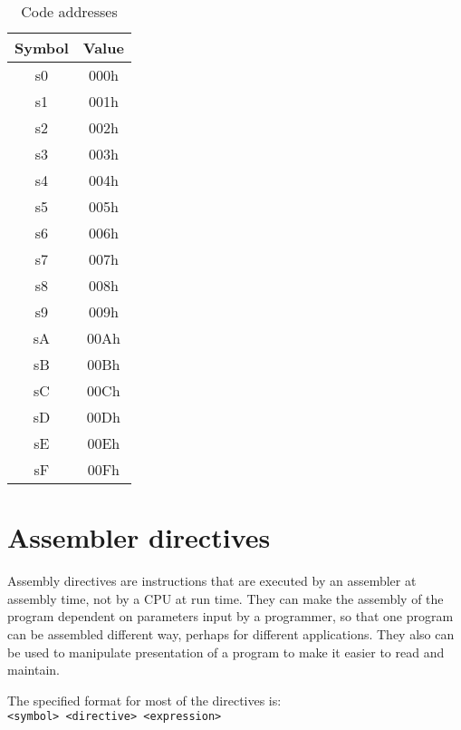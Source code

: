         \begin{table}[h!]
            \centering{}
            \mysmallfont{}

            \begin{tabular}{|cc|}
                \hline
                Symbol & Value \\\hline
                s0     & 000h  \\\hline
                s1     & 001h  \\\hline
                s2     & 002h  \\\hline
                s3     & 003h  \\\hline
                s4     & 004h  \\\hline
                s5     & 005h  \\\hline
                s6     & 006h  \\\hline
                s7     & 007h  \\\hline
                s8     & 008h  \\\hline
                s9     & 009h  \\\hline
                sA     & 00Ah  \\\hline
                sB     & 00Bh  \\\hline
                sC     & 00Ch  \\\hline
                sD     & 00Dh  \\\hline
                sE     & 00Eh  \\\hline
                sF     & 00Fh  \\\hline
            \end{tabular}

            \caption{Code addresses}
        \end{table}

\section{Assembler directives}
    Assembly directives are instructions that are executed by an assembler at assembly time, not by a CPU at run time. They can make the assembly of the program dependent on parameters input by a programmer, so that one program can be assembled different way, perhaps for different applications. They also can be used to manipulate presentation of a program to make it easier to read and maintain.

    \bigskip

    The specified format for most of the directives is:\\
    \verb'<symbol> <directive> <expression>'

